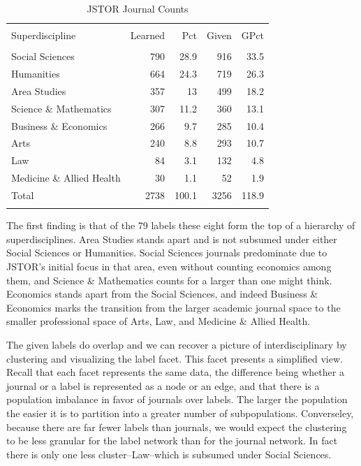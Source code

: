 \documentclass[]{book}
\begin{document}
\begin{table}[!htbp] \centering 
  \caption{JSTOR Journal Counts} 
  \label{tab:jclu-tab-sup} 
\begin{tabular}{@{\extracolsep{5pt}} lrrrr} 
\\[-1.8ex]\hline 
\hline \\[-1.8ex] 
Superdiscipline & Learned & Pct & Given & GPct \\ 
\hline \\[-1.8ex] 
Social Sciences & 790 & 28.9 & 916 & 33.5 \\ 
Humanities & 664 & 24.3 & 719 & 26.3 \\ 
Area Studies & 357 & 13 & 499 & 18.2 \\ 
Science \& Mathematics & 307 & 11.2 & 360 & 13.1 \\ 
Business \& Economics & 266 & 9.7 & 285 & 10.4 \\ 
Arts & 240 & 8.8 & 293 & 10.7 \\ 
Law & 84 & 3.1 & 132 & 4.8 \\ 
Medicine \& Allied Health & 30 & 1.1 & 52 & 1.9 \\ 
Total & 2738 & 100.1 & 3256 & 118.9 \\ 
\hline \\[-1.8ex] 
\end{tabular} 
\end{table}

The first finding is that of the 79 labels these eight form the top of a
hierarchy of superdisciplines. Area Studies stands apart and is not
subsumed under either Social Sciences or Humanities. Social Sciences
journals predominate due to JSTOR's initial focus in that area, even
without counting economics among them, and Science \& Mathematics counts
for a larger than one might think. Economics stands apart from the
Social Sciences, and indeed Business \& Economics marks the transition
from the larger academic journal space to the smaller professional space
of Arts, Law, and Medicine \& Allied Health.

The given labels do overlap and we can recover a picture of
interdisciplinary by clustering and visualizing the label facet. This
facet presents a simplified view. Recall that each facet represents the
same data, the difference being whether a journal or a label is
represented as a node or an edge, and that there is a population
imbalance in favor of journals over labels. The larger the population
the easier it is to partition into a greater number of subpopulations.
Converseley, because there are far fewer labels than journals, we would
expect the clustering to be less granular for the label network than for
the journal network. In fact there is only one less cluster--Law--which
is subsumed under Social Sciences.
\end{document}
